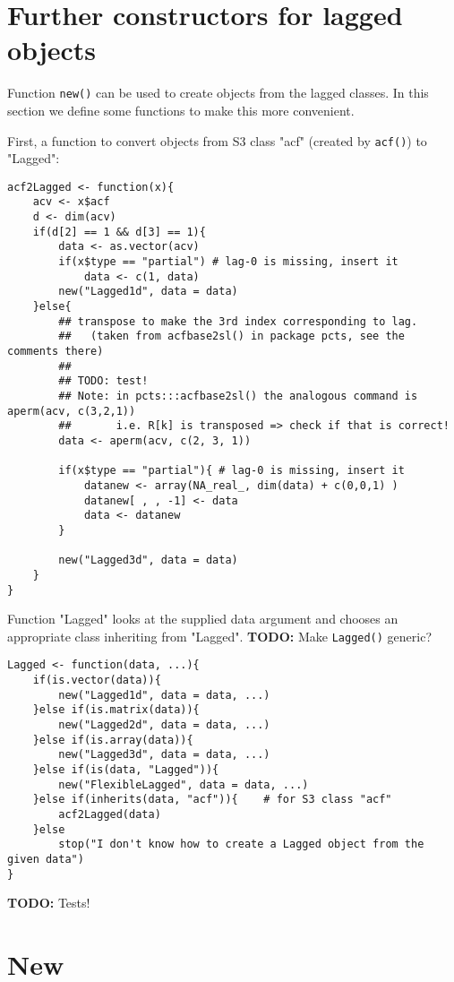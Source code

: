 \documentclass[11pt,a4paper]{article}
\begin{document}
\section{Further constructors for lagged objects}
\label{sec:org0ce2bb8}

Function \texttt{new()} can be used to create objects from the lagged classes.
In this section we define some functions to make this more convenient.

First, a function to convert objects from S3 class "acf" (created by \texttt{acf()}) to "Lagged":
\begin{verbatim}
acf2Lagged <- function(x){
    acv <- x$acf
    d <- dim(acv)
    if(d[2] == 1 && d[3] == 1){
        data <- as.vector(acv)
        if(x$type == "partial") # lag-0 is missing, insert it
            data <- c(1, data)
        new("Lagged1d", data = data)
    }else{
        ## transpose to make the 3rd index corresponding to lag.
        ##   (taken from acfbase2sl() in package pcts, see the comments there)
        ##
        ## TODO: test!
        ## Note: in pcts:::acfbase2sl() the analogous command is aperm(acv, c(3,2,1))
        ##       i.e. R[k] is transposed => check if that is correct!
        data <- aperm(acv, c(2, 3, 1))

        if(x$type == "partial"){ # lag-0 is missing, insert it
            datanew <- array(NA_real_, dim(data) + c(0,0,1) )
            datanew[ , , -1] <- data
            data <- datanew
        }

        new("Lagged3d", data = data)
    }
}
\end{verbatim}


Function "Lagged" looks at the supplied data argument and chooses an appropriate class
inheriting from "Lagged". \textbf{TODO:} Make \texttt{Lagged()} generic?
\begin{verbatim}
Lagged <- function(data, ...){
    if(is.vector(data)){
        new("Lagged1d", data = data, ...)
    }else if(is.matrix(data)){
        new("Lagged2d", data = data, ...)
    }else if(is.array(data)){
        new("Lagged3d", data = data, ...)
    }else if(is(data, "Lagged")){
        new("FlexibleLagged", data = data, ...)
    }else if(inherits(data, "acf")){    # for S3 class "acf"
        acf2Lagged(data)
    }else
        stop("I don't know how to create a Lagged object from the given data")
}
\end{verbatim}

\textbf{TODO:} Tests!


\section{New}
\label{sec:org269ad87}
\end{document}
